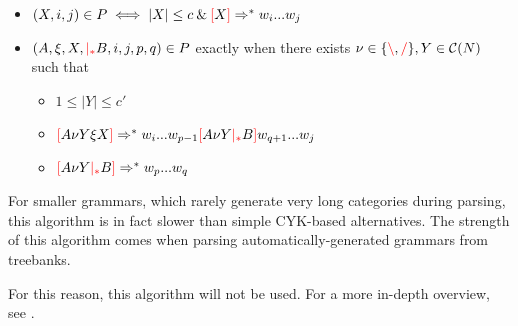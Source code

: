 \documentclass[main.tex]{subfiles}
\begin{document}
\begin{itemize}
    \item $(X, i, j) \in P \iff |X| \leq c \mathbin{\&} \textcolor{red}{[} X \textcolor{red}{]} \Rightarrow^* w_i ... w_j$
    \item $(A, \xi, X, \textcolor{red}{|_{*}} B, i, j, p, q) \in P$
        exactly when there exists $\nu \in \{ \textcolor{red}{\backslash}, \textcolor{red}{/} \}, Y \in \mathcal{C}( N )$ such that
        \begin{itemize}
            \item $1 \leq |Y| \leq c'$
            \item $\textcolor{red}{[} A \nu Y \xi X \textcolor{red}{]} \Rightarrow^* w_i ... w_{p - 1} \textcolor{red}{[} A \nu Y \textcolor{red}{|_{*}} B \textcolor{red}{]} w_{q + 1} ... w_j$
            \item $\textcolor{red}{[} A \nu Y \textcolor{red}{|_{*}} B \textcolor{red}{]} \Rightarrow^* w_p ... w_q$
        \end{itemize}
\end{itemize}

For smaller grammars, which rarely generate very long categories during
parsing, this algorithm is in fact slower than simple CYK-based alternatives.
The strength of this algorithm comes when parsing automatically-generated
grammars from treebanks.

For this reason, this algorithm will not be used. For a more in-depth
overview, see \cite{shanker}.
\end{document}
